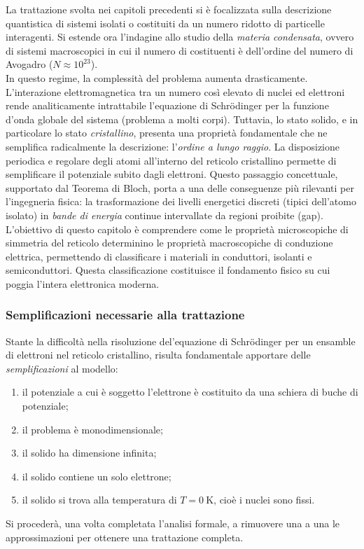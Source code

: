\documentclass[a4paper,11pt]{report}
\begin{document}
La trattazione svolta nei capitoli precedenti si è focalizzata sulla descrizione quantistica di sistemi isolati o costituiti da un numero ridotto di particelle interagenti. Si estende ora l'indagine allo studio della \textit{materia condensata}, ovvero di sistemi macroscopici in cui il numero di costituenti è dell'ordine del numero di Avogadro ($N \approx 10^{23}$). \\

\noindent
In questo regime, la complessità del problema aumenta drasticamente. L'interazione elettromagnetica tra un numero così elevato di nuclei ed elettroni rende analiticamente intrattabile l'equazione di Schrödinger per la funzione d'onda globale del sistema (problema a molti corpi).
Tuttavia, lo stato solido, e in particolare lo stato \textit{cristallino}, presenta una proprietà fondamentale che ne semplifica radicalmente la descrizione: l'\textit{ordine a lungo raggio}. La disposizione periodica e regolare degli atomi all'interno del reticolo cristallino permette di semplificare il potenziale subito dagli elettroni. Questo passaggio concettuale, supportato dal Teorema di Bloch, porta a una delle conseguenze più rilevanti per l'ingegneria fisica: la trasformazione dei livelli energetici discreti (tipici dell'atomo isolato) in \textit{bande di energia} continue intervallate da regioni proibite (gap).
L'obiettivo di questo capitolo è comprendere come le proprietà microscopiche di simmetria del reticolo determinino le proprietà macroscopiche di conduzione elettrica, permettendo di classificare i materiali in conduttori, isolanti e semiconduttori. Questa classificazione costituisce il fondamento fisico su cui poggia l'intera elettronica moderna.

\subsubsection{Semplificazioni necessarie alla trattazione}
Stante la difficoltà nella risoluzione del'equazione di Schrödinger per un ensamble di elettroni nel reticolo cristallino, risulta fondamentale apportare delle \textit{semplificazioni} al modello:
\begin{enumerate}
\item il potenziale a cui è soggetto l’elettrone è costituito da una schiera di buche di potenziale;
\item il problema è monodimensionale;
\item il solido ha dimensione infinita;
\item il solido contiene un solo elettrone;
\item il solido si trova alla temperatura di $T = \SI{0}{\kelvin}$, cioè i nuclei sono fissi.
\end{enumerate} 
Si procederà, una volta completata l'analisi formale, a rimuovere una a una le approssimazioni per ottenere una trattazione completa.
\end{document}
